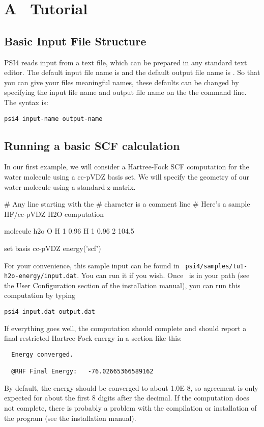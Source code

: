 \section{A \PSIfour\ Tutorial} \label{tutorial}

\subsection{Basic Input File Structure} 

PSI4 reads input from a text file, which can be prepared in any standard
text editor.  The default input file name is  and the
default output file name is .  So that you can give your
files meaningful names, these defaults can be changed by specifying
the input file name and output file name on the the command line.
The syntax is:

{\tt psi4 input-name output-name}

\subsection{Running a basic SCF calculation}
In our first example, we will consider a Hartree-Fock SCF computation
for the water molecule using a cc-pVDZ basis set.  We will specify the
geometry of our water molecule using a standard z-matrix.

\begin{Snippet}

# Any line starting with the # character is a comment line
# Here's a sample HF/cc-pVDZ H2O computation

molecule h2o {
  O 
  H 1 0.96
  H 1 0.96 2 104.5
}

set basis cc-pVDZ
energy('scf')
\end{Snippet}

For your convenience, this sample input can be found in {\tt
psi4/samples/tu1-h2o-energy/input.dat}.  You can run it if you wish.
Once \PSIfour\ is in your path (see the User Configuration section of the
installation manual), you can run this computation by typing
\begin{verbatim}
psi4 input.dat output.dat
\end{verbatim}
If everything goes well, the computation should complete and should report
a final restricted Hartree-Fock energy in a section like this:
\begin{verbatim}
  Energy converged.

  @RHF Final Energy:   -76.02665366589162
\end{verbatim}
By default, the energy should be converged to about 1.0E-8, so agreement
is only expected for about the first 8 digits after the decimal.  If the
computation does not complete, there is probably a problem with the
compilation or installation of the program (see the installation manual).

